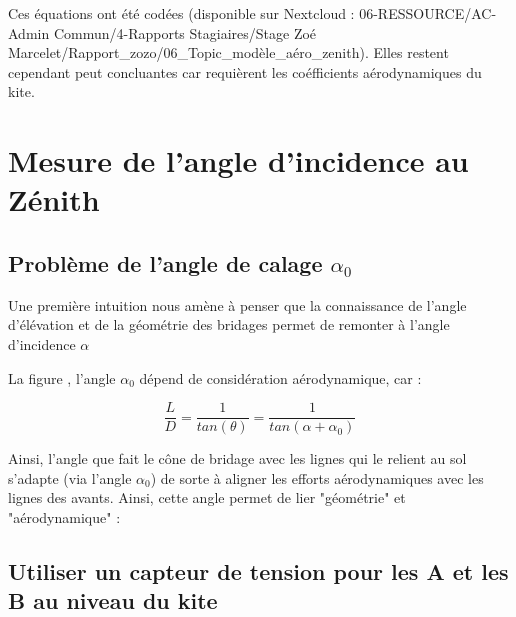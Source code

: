 \documentclass[conference]{IEEEtran}
\begin{document}
Ces équations ont été codées (disponible sur Nextcloud : 06-RESSOURCE/AC-Admin Commun/4-Rapports Stagiaires/Stage Zoé Marcelet/Rapport\_zozo/06\_Topic\_modèle\_aéro\_zenith). 
Elles restent cependant peut concluantes car requièrent les coéfficients aérodynamiques du kite. 

\IEEEpeerreviewmaketitle
\section{Mesure de l'angle d'incidence au Zénith}

\subsection{Problème de l'angle de calage $\alpha_0$} 


Une première intuition nous amène à penser que la connaissance de l'angle d'élévation et de la géométrie des bridages permet de remonter à l'angle d'incidence $\alpha$


La figure , l'angle $\alpha_0$ dépend de considération aérodynamique, car : 
\begin{center}
    \begin{equation}
        \frac{L}{D} = \frac{1}{tan(\theta)} = \frac{1}{tan(\alpha + \alpha_0)}
    \end{equation}
\end{center}
Ainsi, l'angle que fait le cône de bridage avec les lignes qui le relient au sol s'adapte (via l'angle $\alpha_0$) de sorte à aligner les efforts aérodynamiques avec les lignes des avants. Ainsi, cette angle permet de lier "géométrie" et "aérodynamique" :  



\subsection{Utiliser un capteur de tension pour les A et les B au niveau du kite}
\end{document}
